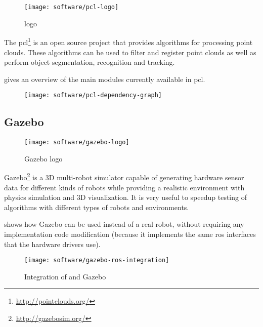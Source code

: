 \begin{wrapfigure}{r}{0.25\textwidth}
	\centering
	\texttt{[image: software/pcl-logo]}
	\caption{ logo}
	\label{pcl-logo}
\end{wrapfigure}

The \gls{pcl}\footnote{\url{http://pointclouds.org/}} \cite{Rusu2011} is an open source project that provides algorithms for processing point clouds. These algorithms can be used to filter and register point clouds as well as perform object segmentation, recognition and tracking.

 gives an overview of the main modules currently available in \gls{pcl}.

\begin{figure}[H]
	\centering
	\texttt{[image: software/pcl-dependency-graph]}
	\caption[]{\protect\footnotemark}
	\label{fig:pcl-dependency-graph}
\end{figure}


\subsection{Gazebo}

\begin{wrapfigure}{r}{0.25\textwidth}
	\centering
	\texttt{[image: software/gazebo-logo]}
	\caption{Gazebo logo}
	\label{fig:gazebo-logo}
\end{wrapfigure}


Gazebo\footnote{\url{http://gazebosim.org/}} is a 3D multi-robot simulator capable of generating hardware sensor data for different kinds of robots while providing a realistic environment with physics simulation and 3D visualization. It is very useful to speedup testing of algorithms with different types of robots and environments.

 shows how Gazebo can be used instead of a real robot, without requiring any implementation code modification (because it implements the same \gls{ros} interfaces that the hardware drivers use).

\begin{figure}[H]
	\centering
	\texttt{[image: software/gazebo-ros-integration]}
	\caption[Integration of  and Gazebo]{Integration of  and Gazebo\protect\footnotemark}
	\label{fig:gazebo-ros-integration}
\end{figure}


